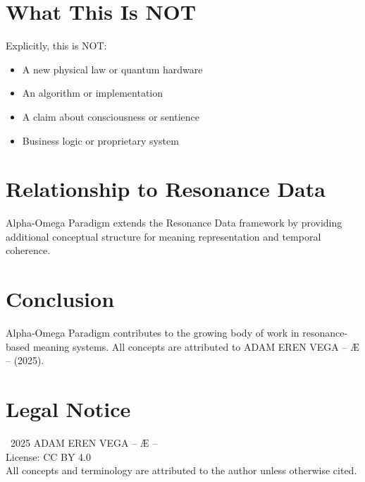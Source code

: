 \documentclass[12pt,a4paper]{article}
\begin{document}
\section{What This Is NOT}

Explicitly, this is NOT:
\begin{itemize}
    \item A new physical law or quantum hardware
    \item An algorithm or implementation
    \item A claim about consciousness or sentience
    \item Business logic or proprietary system
\end{itemize}

\section{Relationship to Resonance Data}

Alpha-Omega Paradigm extends the Resonance Data framework by providing additional conceptual structure for meaning representation and temporal coherence.

\section{Conclusion}

Alpha-Omega Paradigm contributes to the growing body of work in resonance-based meaning systems. All concepts are attributed to ADAM EREN VEGA – Æ – (2025).

\section*{Legal Notice}

\textcopyright\ 2025 ADAM EREN VEGA – Æ –\\
License: CC BY 4.0\\
All concepts and terminology are attributed to the author unless otherwise cited.
\end{document}

